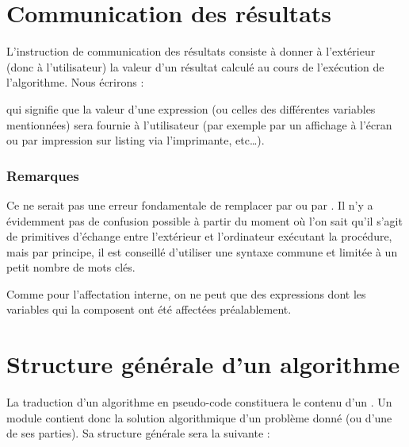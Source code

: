 	\section{Communication des résultats}

		L’instruction de communication des résultats consiste à donner à
		l’extérieur (donc à l’utilisateur) la valeur d’un résultat 
		calculé au cours de l’exécution de l’algorithme. Nous écrirons :


		qui signifie que la valeur d’une expression (ou celles des différentes
		variables mentionnées) sera fournie à l’utilisateur (par exemple par un
		affichage à l’écran ou par impression sur listing via l’imprimante,
		etc\dots).

		\subsubsection*{Remarques}

		\begin{liste}
		\item
			Ce ne serait pas une erreur fondamentale de remplacer
			 par  ou
			 par . Il n’y a
			évidemment pas de confusion possible à partir du moment où l’on sait
			qu’il s’agit de primitives d’échange entre l’extérieur et l’ordinateur
			exécutant la procédure, mais par principe, il est conseillé d’utiliser
			une syntaxe commune et limitée à un petit nombre de mots clés.
		\item
			Comme pour l’affectation interne, on ne peut 
			que des expressions dont les variables qui la composent ont été 
			affectées préalablement.
		\end{liste}

	\section{Structure générale d’un algorithme}

		La traduction d’un algorithme en pseudo-code constituera le contenu d’un
		. Un module contient donc la solution
		algorithmique d’un problème donné (ou d’une de ses parties). Sa
		structure générale sera la suivante :

